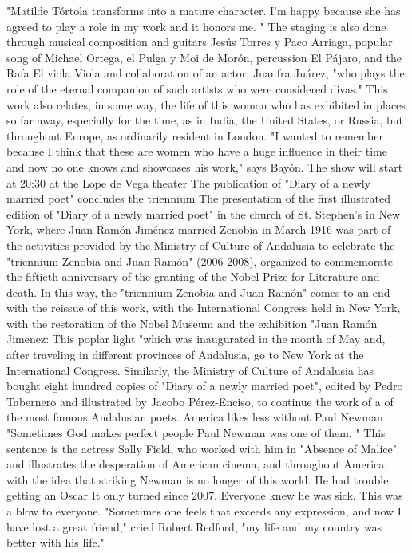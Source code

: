 "Matilde Tórtola transforms into a mature character.
I'm happy because she has agreed to play a role in my work and it honors me. "
The staging is also done through musical composition and guitars Jesús Torres y Paco Arriaga, popular song of Michael Ortega, el Pulga y Moi de Morón, percussion El Pájaro, and the Rafa El viola Viola and collaboration of an actor, Juanfra Juárez, "who plays the role of the eternal companion of such artists who were considered divas."
This work also relates, in some way, the life of this woman who has exhibited in places so far away, especially for the time, as in India, the United States, or Russia, but throughout Europe, as ordinarily resident in London.
"I wanted to remember because I think that these are women who have a huge influence in their time and now no one knows and showcases his work," says Bayón.
The show will start at 20:30 at the Lope de Vega theater
The publication of "Diary of a newly married poet" concludes the triennium
The presentation of the first illustrated edition of "Diary of a newly married poet" in the church of St. Stephen's in New York, where Juan Ramón Jiménez married Zenobia in March 1916 was part of the activities provided by the Ministry of Culture of Andalusia to celebrate the "triennium Zenobia and Juan Ramón" (2006-2008), organized to commemorate the fiftieth anniversary of the granting of the Nobel Prize for Literature and death.
In this way, the "triennium Zenobia and Juan Ramón" comes to an end with the reissue of this work, with the International Congress held in New York, with the restoration of the Nobel Museum and the exhibition "Juan Ramón Jimenez: This poplar light "which was inaugurated in the month of May and, after traveling in different provinces of Andalusia, go to New York at the International Congress.
Similarly, the Ministry of Culture of Andalusia has bought eight hundred copies of "Diary of a newly married poet", edited by Pedro Tabernero and illustrated by Jacobo Pérez-Enciso, to continue the work of a of the most famous Andalusian poets.
America likes less without Paul Newman
"Sometimes God makes perfect people
Paul Newman was one of them. "
This sentence is the actress Sally Field, who worked with him in "Absence of Malice" and illustrates the desperation of American cinema, and throughout America, with the idea that striking Newman is no longer of this world.
He had trouble getting an Oscar
It only turned since 2007.
Everyone knew he was sick.
This was a blow to everyone.
"Sometimes one feels that exceeds any expression, and now I have lost a great friend," cried Robert Redford, "my life and my country was better with his life."
